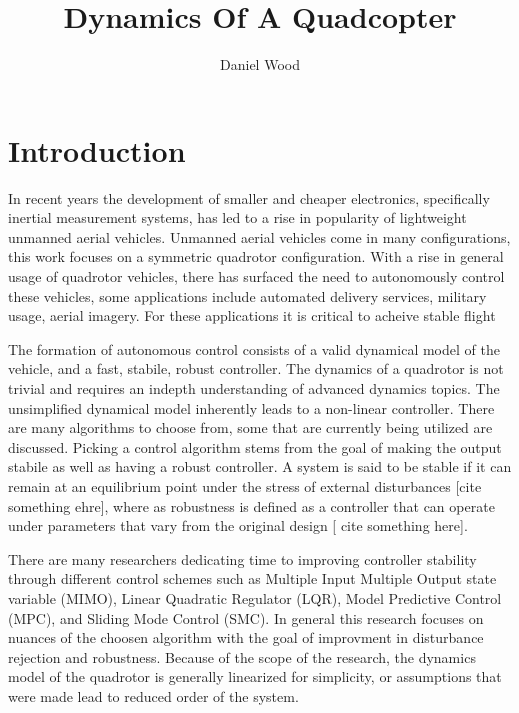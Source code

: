 \documentclass[9pt]{article}
\begin{document}
\title{Dynamics Of A Quadcopter}
\author{Daniel Wood}
\maketitle
\section{Introduction}

In recent years the development of smaller and cheaper electronics, specifically inertial measurement systems, has led to a rise in popularity of lightweight unmanned aerial vehicles. Unmanned aerial vehicles come in many configurations, this work focuses on a symmetric quadrotor configuration. With a rise in general usage of quadrotor vehicles, there has surfaced the need to autonomously control these vehicles, some applications include automated delivery services, military usage, aerial imagery. For these applications it is critical to acheive stable flight

The formation of autonomous control consists of a valid dynamical model of the vehicle, and a fast, stabile, robust controller. The dynamics of a quadrotor is not trivial and requires an indepth understanding of advanced dynamics topics. The unsimplified dynamical model inherently leads to a non-linear controller. There are many algorithms to choose from, some that are currently being utilized are discussed. Picking a control algorithm stems from the goal of making the output stabile as well as having a robust controller. A system is said to be stable if it can remain at an equilibrium point under the stress of external disturbances [cite something ehre], where as robustness is defined as a controller that can operate under parameters that vary from the original design [ cite something here].

There are many researchers dedicating time to improving controller stability through different control schemes such as Multiple Input Multiple Output state variable (MIMO)\cite{FarameeVeeravat2014EotS}, Linear Quadratic Regulator (LQR), Model Predictive Control (MPC), and Sliding Mode Control (SMC). In general this research focuses on nuances of the choosen algorithm with the goal of improvment in disturbance rejection\cite{DenisKotarski2016CDFU} and robustness. Because of the scope of the research, the dynamics model of the quadrotor is generally linearized for simplicity, or assumptions that were made lead to reduced order of the system\cite{FarameeVeeravat2014EotS}. 
\end{document}
